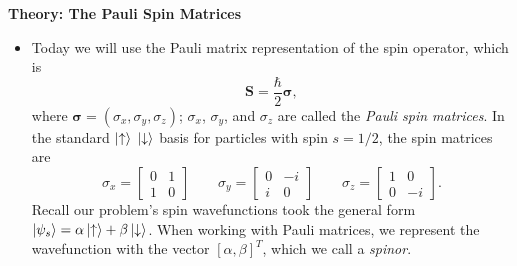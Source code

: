 \documentclass[11pt, a4paper]{article}
\renewcommand{\vec}[1]{\bm{#1}} %
\newcommand{\ua}{\uparrow}  %
\newcommand{\da}{\downarrow}  %
\begin{document}
\textbf{Theory: The Pauli Spin Matrices}
\begin{itemize}
	\item  Today we will use the Pauli matrix representation of the spin operator, which is
	\begin{equation*}
		\vec{S} = \frac{\hbar}{2}\vec{\sigma},
	\end{equation*}
	where $ \vec{\sigma} = (\sigma_{x}, \sigma_{y}, \sigma_{z})$; $ \sigma_{x}$, $\sigma_{y}$, and $ \sigma_{z} $ are called the \textit{Pauli spin matrices}. In the standard $ \ket{\ua}$ $\ket{\da} $ basis for particles with spin $ s = 1/2 $, the spin matrices are
	\begin{equation*}
		\sigma_{x} = 
		\begin{bmatrix}
			0 & 1\\
			1 & 0
		\end{bmatrix}
		\qquad
		\sigma_{y} = 
		\begin{bmatrix}
			0 & -i\\
			i & 0
		\end{bmatrix}
		\qquad
		\sigma_{z} = 
		\begin{bmatrix}
			1 & 0\\
			0 & -i
		\end{bmatrix}.
	\end{equation*}
	Recall our problem's spin wavefunctions took the general form $ \ket{\psi_{s}} = \alpha \ket{\ua} + \beta \ket{\da} $. When working with Pauli matrices, we represent the wavefunction with the vector $ [\alpha, \beta]^{T} $, which we call a \textit{spinor}.
\end{itemize}
\end{document}
